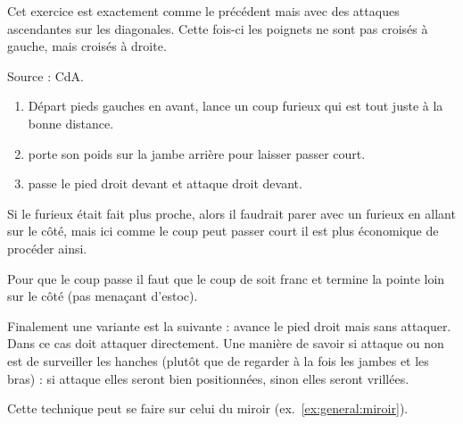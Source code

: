 \begin{exercice}
Cet exercice est exactement comme le précédent mais avec des attaques ascendantes sur les diagonales. Cette fois-ci les poignets ne sont pas croisés à gauche, mais croisés à droite.

Source : CdA.
\end{exercice}


\begin{technique}

\begin{enumerate}
	\item Départ pieds gauches en avant, \A lance un coup furieux qui est tout juste à la bonne distance.
	\item \D porte son poids sur la jambe arrière pour laisser passer court.
	\item \D passe le pied droit devant et attaque droit devant.
\end{enumerate}

Si le furieux était fait plus proche, alors il faudrait parer avec un furieux en allant sur le côté, mais ici comme le coup peut passer court il est plus économique de procéder ainsi.

Pour que le coup passe il faut que le coup de \D soit franc et termine la pointe loin sur le côté (pas menaçant d'estoc).

Finalement une variante est la suivante : \A avance le pied droit mais sans attaquer. Dans ce cas \D doit attaquer directement. Une manière de savoir si \A attaque ou non est de surveiller les hanches (plutôt que de regarder à la fois les jambes et les bras) : si \A attaque elles seront bien positionnées, sinon elles seront vrillées.

Cette technique peut se faire sur celui du miroir (ex.~\ref{ex:general:miroir}).
\end{technique}


